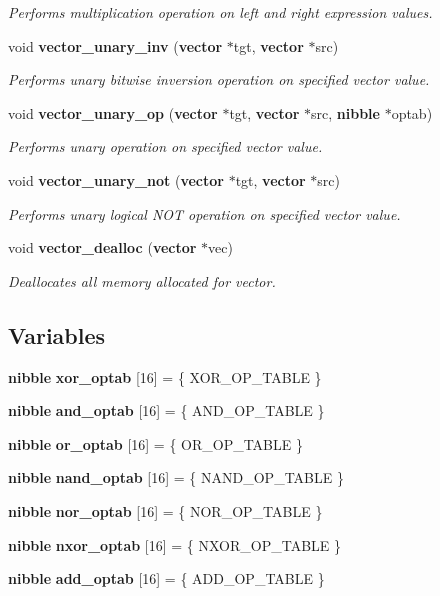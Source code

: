 \begin{CompactItemize}
\begin{CompactList}\small\item\em Performs multiplication operation on left and right expression values.\item\end{CompactList}\item 
void {\bf vector\_\-unary\_\-inv} ({\bf vector} $\ast$tgt, {\bf vector} $\ast$src)
\begin{CompactList}\small\item\em Performs unary bitwise inversion operation on specified vector value.\item\end{CompactList}\item 
void {\bf vector\_\-unary\_\-op} ({\bf vector} $\ast$tgt, {\bf vector} $\ast$src, {\bf nibble} $\ast$optab)
\begin{CompactList}\small\item\em Performs unary operation on specified vector value.\item\end{CompactList}\item 
void {\bf vector\_\-unary\_\-not} ({\bf vector} $\ast$tgt, {\bf vector} $\ast$src)
\begin{CompactList}\small\item\em Performs unary logical NOT operation on specified vector value.\item\end{CompactList}\item 
void {\bf vector\_\-dealloc} ({\bf vector} $\ast$vec)
\begin{CompactList}\small\item\em Deallocates all memory allocated for vector.\item\end{CompactList}\end{CompactItemize}
\subsection*{Variables}
\begin{CompactItemize}
\item 
{\bf nibble} {\bf xor\_\-optab} [16] = \{ XOR\_\-OP\_\-TABLE \}
\item 
{\bf nibble} {\bf and\_\-optab} [16] = \{ AND\_\-OP\_\-TABLE \}
\item 
{\bf nibble} {\bf or\_\-optab} [16] = \{ OR\_\-OP\_\-TABLE \}
\item 
{\bf nibble} {\bf nand\_\-optab} [16] = \{ NAND\_\-OP\_\-TABLE \}
\item 
{\bf nibble} {\bf nor\_\-optab} [16] = \{ NOR\_\-OP\_\-TABLE \}
\item 
{\bf nibble} {\bf nxor\_\-optab} [16] = \{ NXOR\_\-OP\_\-TABLE \}
\item 
{\bf nibble} {\bf add\_\-optab} [16] = \{ ADD\_\-OP\_\-TABLE \}
\end{CompactItemize}


